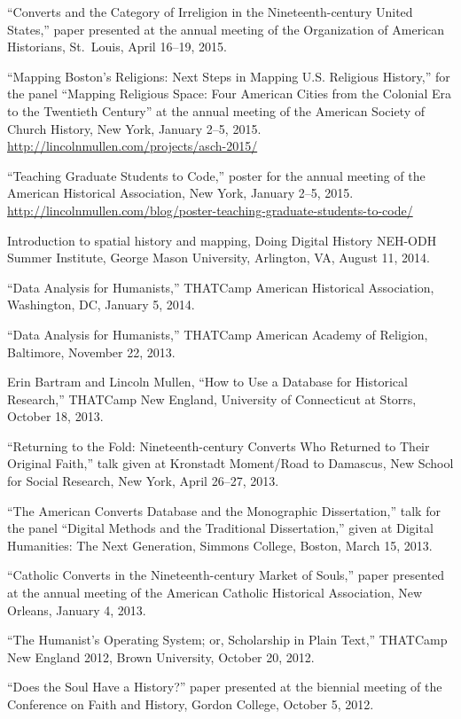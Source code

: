 \documentclass[11pt]{article}
\begin{document}
``Converts and the Category of Irreligion in the Nineteenth-century
United States,'' paper presented at the annual meeting of the
Organization of American Historians, St.~Louis, April 16--19, 2015.

``Mapping Boston's Religions: Next Steps in Mapping U.S. Religious History,'' 
for the panel ``Mapping Religious Space: Four American Cities from the 
Colonial Era to the Twentieth Century'' at the annual meeting of the American 
Society of Church History, New York, January 2--5, 2015.  
\url{http://lincolnmullen.com/projects/asch-2015/}

``Teaching Graduate Students to Code,'' poster for the annual meeting of the
American Historical Association, New York, January 2--5, 2015.
\url{http://lincolnmullen.com/blog/poster-teaching-graduate-students-to-code/}

Introduction to spatial history and mapping, Doing Digital History NEH-ODH 
Summer Institute, George Mason University, Arlington, VA, August 11, 2014.

``Data Analysis for Humanists,'' THATCamp American Historical Association, 
Washington, DC, January 5, 2014.

``Data Analysis for Humanists,'' THATCamp American Academy of Religion, 
Baltimore, November 22, 2013.

Erin Bartram and Lincoln Mullen, ``How to Use a Database for Historical 
Research,'' THATCamp New England, University of Connecticut at Storrs, October 
18, 2013.

``Returning to the Fold: Nineteenth-century Converts Who Returned to
Their Original Faith,'' talk given at Kronstadt Moment/Road to Damascus,
New School for Social Research, New York, April 26--27, 2013.

``The American Converts Database and the Monographic Dissertation,''
talk for the panel ``Digital Methods and the Traditional Dissertation,''
given at Digital Humanities: The Next Generation, Simmons College,
Boston, March 15, 2013.

``Catholic Converts in the Nineteenth-century Market of Souls,'' paper
presented at the annual meeting of the American Catholic Historical
Association, New Orleans, January 4, 2013.

``The Humanist's Operating System; or, Scholarship in Plain Text,'' THATCamp 
New England 2012, Brown University, October 20, 2012.

``Does the Soul Have a History?'' paper presented at the biennial
meeting of the Conference on Faith and History, Gordon College, October
5, 2012.
\end{document}
